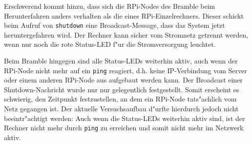 \begin{enumerate}
Erschwerend kommt hinzu, dass sich die RPi-Nodes des Bramble beim Herunterfahren anders verhalten als die eines RPi-Einzelrechners. Dieser schickt beim Aufruf von \texttt{shutdown} eine Broadcast-Message, dass das System jetzt heruntergefahren wird. Der Rechner kann sicher vom Stromnetz getrennt werden, wenn nur noch die rote Status-LED f"ur die Stromversorgung leuchtet.  

Beim Bramble hingegen sind alle Status-LEDs weiterhin aktiv, auch wenn der RPi-Node nicht mehr auf ein \texttt{ping} reagiert, d.h. keine IP-Verbindung vom Server oder einem anderen RPi-Node aus aufgebaut werden kann. Der Broadcast einer Shutdown-Nachricht wurde nur nur gelegentlich festgestellt. Somit erscheint es schwierig, den Zeitpunkt festzustellen, an dem ein RPi-Node tats"achlich vom Netz gegangen ist. Der aktuelle Versuchsaufbau d"urfte hierdurch jedoch nicht beeintr"achtigt werden: Auch wenn die Status-LEDs weiterhin aktiv sind, ist der Rechner nicht mehr durch \texttt{ping} zu erreichen und somit nicht mehr im Netzwerk aktiv. 
\end{enumerate}
\endinput 
